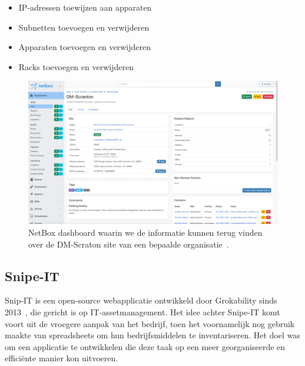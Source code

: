 \begin{itemize}
    \item IP-adressen toewijzen aan apparaten
    \item Subnetten toevoegen en verwijderen
    \item Apparaten toevoegen en verwijderen
    \item Racks toevoegen en verwijderen
\end{itemize}

\begin{figure}[h!]
    \includegraphics[width=\textwidth]
    {./graphics/netbox-dashboard.png}
    \caption{\label{fig:netbox-dashboard}NetBox dashboard waarin we de informatie kunnen terug vinden over de DM-Scraton site van een bepaalde organisatie~\autocite{netbox-dashboard}.}
\end{figure}

\subsection{Snipe-IT}
\label{sub:snipe-it}

Snip-IT is een open-source webapplicatie ontwikkeld door Grokability sinds 2013~\autocite{snipe-it-introduction}, die gericht is op IT-assetmanagement.
Het idee achter Snipe-IT komt voort uit de vroegere aanpak van het bedrijf, toen het voornamelijk nog gebruik maakte van spreadsheets om hun bedrijfsmiddelen te inventariseren.
Het doel was om een applicatie te ontwikkelen die deze taak op een meer georganiseerde en effici\"ente manier kon uitvoeren.

